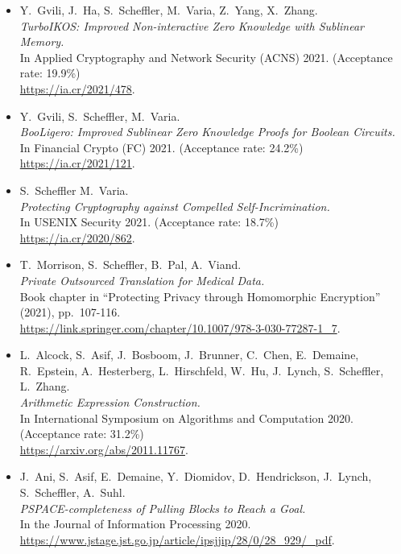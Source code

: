 \documentclass{res}
\begin{document}
\begin{resume}
\begin{itemize}
\item[\turboikos] Y.~Gvili, J.~Ha, S.~Scheffler, M.~Varia, Z.~Yang, X.~Zhang. \\
\emph{TurboIKOS: Improved Non-interactive Zero Knowledge with Sublinear Memory.} \\
In Applied Cryptography and Network Security (ACNS) 2021. (Acceptance rate: 19.9\%) \\
\url{https://ia.cr/2021/478}.

\item[\booligero] Y.~Gvili, S.~Scheffler, M.~Varia. \\
\emph{BooLigero: Improved Sublinear Zero Knowledge Proofs for Boolean Circuits.} \\
In Financial Crypto (FC) 2021.  (Acceptance rate: 24.2\%) \\
\url{https://ia.cr/2021/121}.

\item[\foregoneconclusion] S.~Scheffler M.~Varia. \\
\emph{Protecting Cryptography against Compelled Self-Incrimination.} \\
In USENIX Security 2021. (Acceptance rate: 18.7\%)\\
\url{https://ia.cr/2020/862}.

\item[\privateTranslation] T.~Morrison, S.~Scheffler, B.~Pal, A.~Viand. \\
\emph{Private Outsourced Translation for Medical Data.} \\
Book chapter in ``Protecting Privacy through Homomorphic Encryption'' (2021), pp.~107-116. \\
\url{https://link.springer.com/chapter/10.1007/978-3-030-77287-1_7}.

\item[\AEC] L.~Alcock, S.~Asif, J.~Bosboom, J.~Brunner, C.~Chen, E.~Demaine, R.~Epstein,
A.~Hesterberg, L.~Hirschfeld, W.~Hu, J.~Lynch, S.~Scheffler, L.~Zhang. \\
\emph{Arithmetic Expression Construction.} \\
In International Symposium on Algorithms and Computation 2020. (Acceptance rate: 31.2\%) \\
\url{https://arxiv.org/abs/2011.11767}.

\item[\pullingblocksJIP] J.~Ani, S.~Asif, E.~Demaine, Y.~Diomidov, D.~Hendrickson, J.~Lynch, S.~Scheffler, A.~Suhl. \\
\emph{PSPACE-completeness of Pulling Blocks to Reach a Goal.} \\
In the Journal of Information Processing 2020.\\
\url{https://www.jstage.jst.go.jp/article/ipsjjip/28/0/28_929/_pdf}.


\end{itemize}
\end{resume}
\end{document}
